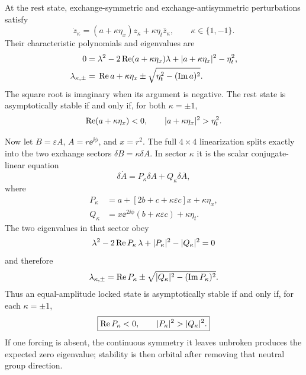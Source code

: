 At the rest state, exchange-symmetric and exchange-antisymmetric
perturbations satisfy
\begin{equation}
 \dot z_\kappa=(a+\kappa\eta_x)z_\kappa
 +\kappa\eta_t\overline z_\kappa,\qquad \kappa\in\{1,-1\}.
 \label{eq:rest-exchange-modes}
\end{equation}
Their characteristic polynomials and eigenvalues are
\begin{align}
 0={}&\lambda^2-2\operatorname{Re}(a+\kappa\eta_x)\lambda
 +|a+\kappa\eta_x|^2-\eta_t^2,
 \label{eq:rest-characteristic}\\
 \lambda_{\kappa,\pm}
 ={}&\operatorname{Re} a+\kappa\eta_x
 \pm\sqrt{\eta_t^2-(\operatorname{Im} a)^2}.
 \label{eq:rest-eigenvalues}
\end{align}
The square root is imaginary when its argument is negative. The rest state
is asymptotically stable if and only if, for both $\kappa=\pm1$,
\begin{equation}
 \operatorname{Re}(a+\kappa\eta_x)<0,\qquad
 |a+\kappa\eta_x|^2>\eta_t^2.
 \label{eq:rest-stability}
\end{equation}

Now let $B=\varepsilon A$, $A=r\ee^{\ii\phi}$, and $x=r^2$. The full
$4\times4$ linearization splits exactly into the two exchange sectors
$\delta B=\kappa\delta A$. In sector $\kappa$ it is the scalar
conjugate-linear equation
\begin{equation}
 \delta\dot A=P_\kappa\delta A+Q_\kappa\delta\overline A,
 \label{eq:equal-sector-linearization}
\end{equation}
where
\begin{align}
 P_\kappa&=
 a+\left[2b+c+\kappa\varepsilon c\right]x+\kappa\eta_x,
 \label{eq:equal-sector-P}\\
 Q_\kappa&=
 x\ee^{2\ii\phi}(b+\kappa\varepsilon c)+\kappa\eta_t.
 \label{eq:equal-sector-Q}
\end{align}
The two eigenvalues in that sector obey
\begin{equation}
 \lambda^2-2\operatorname{Re} P_\kappa\,\lambda
 +|P_\kappa|^2-|Q_\kappa|^2=0
 \label{eq:equal-sector-characteristic}
\end{equation}
and therefore
\begin{equation}
 \lambda_{\kappa,\pm}
 =\operatorname{Re} P_\kappa
 \pm\sqrt{|Q_\kappa|^2-(\operatorname{Im} P_\kappa)^2}.
 \label{eq:equal-sector-eigenvalues}
\end{equation}
Thus an equal-amplitude locked state is asymptotically stable if and only if,
for each $\kappa=\pm1$,
\begin{equation}
 \boxed{\operatorname{Re} P_\kappa<0,\qquad
 |P_\kappa|^2>|Q_\kappa|^2.}
 \label{eq:equal-sector-stability}
\end{equation}
If one forcing is absent, the continuous symmetry it leaves unbroken
produces the expected zero eigenvalue; stability is then orbital after
removing that neutral group direction.


